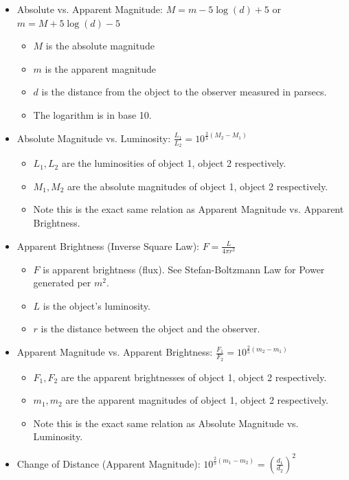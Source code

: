 \documentclass[letterpaper,14pt]{extarticle}
\begin{document}
\begin{itemize}
    \item Absolute vs. Apparent Magnitude: $M = m - 5\log(d) + 5$ or $m = M + 5\log(d) - 5$
    \begin{itemize}
        \item $M$ is the absolute magnitude
        \item $m$ is the apparent magnitude
        \item $d$ is the distance from the object to the observer measured in parsecs.
        \item The logarithm is in base 10.
    \end{itemize}
    \item Absolute Magnitude vs. Luminosity: $\frac{L_1}{L_2} = 10^{\frac{2}{5}(M_2 - M_1)}$
        \begin{itemize}
        \item $L_1, L_2$ are the luminosities of object 1, object 2 respectively.
        \item $M_1, M_2$ are the absolute magnitudes of object 1, object 2 respectively.
        \item Note this is the exact same relation as Apparent Magnitude vs. Apparent Brightness.
    \end{itemize}
    \item Apparent Brightness (Inverse Square Law): $F = \frac{L}{4\pi r^2}$ 
    \begin{itemize}
        \item $F$ is apparent brightness (flux). See Stefan-Boltzmann Law for Power generated per $m^2$.
        \item $L$ is the object's luminosity.
        \item $r$ is the distance between the object and the observer.
    \end{itemize}
    \item Apparent Magnitude vs. Apparent Brightness: $\frac{F_1}{F_2} = 10^{\frac{2}{5}(m_2 - m_1)}$
    \begin{itemize}
        \item $F_1, F_2$ are the apparent brightnesses of object 1, object 2 respectively.
        \item $m_1, m_2$ are the apparent magnitudes of object 1, object 2 respectively.
        \item Note this is the exact same relation as Absolute Magnitude vs. Luminosity.
    \end{itemize}
    \item Change of Distance (Apparent Magnitude): $10^{\frac{2}{5}(m_1 - m_2)} = (\frac{d_1}{d_2})^2$ 

\end{itemize}
\end{document}
